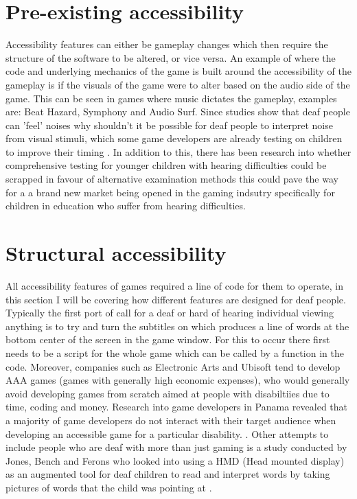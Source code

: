 \documentclass{scrartcl}
\begin{document}
\section{Pre-existing accessibility}
Accessibility features can either be gameplay changes which then require the structure of the software to be altered, or vice versa. An example of where the code and underlying mechanics of the game is built around the accessibility of the gameplay is if the visuals of the game were to alter based on the audio side of the game. This can be seen in games where music dictates the gameplay, examples are: Beat Hazard\cite {game:beathazard}, Symphony\cite {game:symphony} and Audio Surf\cite {game:audiosurf}. Since studies show that deaf people can 'feel' noises \cite {Nanayakkara} why shouldn't it be possible for deaf people to interpret noise from visual stimuli, which some game developers are already testing on children to improve their timing  \cite {Jouhtimak}. In addition to this, there has been research into whether comprehensive testing for younger children with hearing difficulties could be scrapped in favour of alternative examination methods \cite{Mich} this could pave the way for a a brand new market being opened in the gaming indsutry specifically for children in education who suffer from hearing difficulties.

\section{Structural accessibility}
All accessibility features of games required a line of code for them to operate, in this section I will be covering how different features are designed for deaf people.
Typically the first port of call for a deaf or hard of hearing individual viewing anything is to try and turn the subtitles on which produces a line of words at the bottom center of the screen in the game window. For this to occur there first needs to be a script for the whole game which can be called by a function in the code. Moreover, companies such as Electronic Arts and Ubisoft tend to develop AAA games (games with generally high economic expenses), who would generally avoid developing games from scratch aimed at people with disabiltiies due to time, coding and money. Research into game developers in Panama revealed that a majority of game developers do not interact with their target audience when developing an accessible game for a particular disability. \cite {moreno}. Other attempts to include people who are deaf with more than just gaming is a study conducted by Jones, Bench and Ferons who looked into using a HMD (Head mounted display) as an augmented tool for deaf children to read and interpret words by taking pictures of words that the child was pointing at \cite {Jones}.
\end{document}
